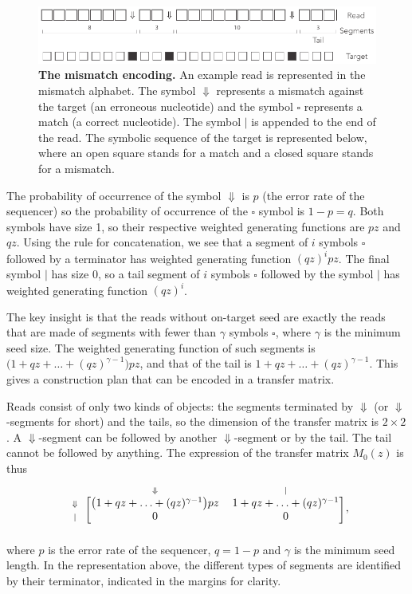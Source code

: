 \documentclass{article}
\begin{document}
\begin{figure}[h]
\centering
\includegraphics[scale=0.85]{sketch_simple.pdf}
\caption{\textbf{The mismatch encoding.}
An example read is represented in the mismatch alphabet. The symbol
$\Downarrow$ represents a mismatch against the target (an erroneous
nucleotide) and the symbol $\square$ represents a match (a correct
nucleotide). The symbol $|$ is appended to the end of the read. The
symbolic sequence of the target is represented below, where an open square
stands for a match and a closed square stands for a mismatch.}
\label{fig:simple}
\end{figure}

The probability of occurrence of the symbol $\Downarrow$ is $p$ (the error
rate of the sequencer) so the probability of occurrence of the $\square$
symbol is $1-p = q$. Both symbols have size 1, so their respective
weighted generating functions are $pz$ and $qz$. Using the rule for
concatenation, we see that a segment of $i$ symbols $\square$ followed by
a terminator has weighted generating function $(qz)^ipz$. The final symbol
$|$ has size 0, so a tail segment of $i$ symbols $\square$ followed by the
symbol $|$ has weighted generating function $(qz)^i$.

The key insight is that the reads without on-target seed are exactly the
reads that are made of segments with fewer than $\gamma$ symbols
$\square$, where $\gamma$ is the minimum seed size. The weighted
generating function of such segments is $\big( 1+qz+\ldots+(qz)^{\gamma-1}
\big) pz$, and that of the tail is $1+qz+\ldots+(qz)^{\gamma-1}$. This
gives a construction plan that can be encoded in a transfer matrix.

Reads consist of only two kinds of objects: the segments terminated by
$\Downarrow$ (or $\Downarrow$-segments for short) and the tails, so the
dimension of the transfer matrix is $2 \times 2$. A $\Downarrow$-segment
can be followed by another $\Downarrow$-segment or by the tail. The tail
cannot be followed by anything. The expression of the transfer matrix
$M_0(z)$ is thus
\begin{equation*}
\begin{blockarray}{ccc}
   & \scriptstyle{\Downarrow} & \scriptstyle{|} \\
\begin{block}{c[cc]}
\scriptstyle{\Downarrow} & \big( 1+qz+\ldots+(qz)^{\gamma-1}
\big) pz  & 1+qz+\ldots+(qz)^{\gamma-1} \\
\scriptstyle{|} & 0 & 0 \\
\end{block}
\end{blockarray},
\end{equation*}
where $p$ is the error rate of the sequencer, $q=1-p$ and $\gamma$ is the
minimum seed length. In the representation above, the different types of
segments are identified by their terminator, indicated in the margins for
clarity.
\end{document}
